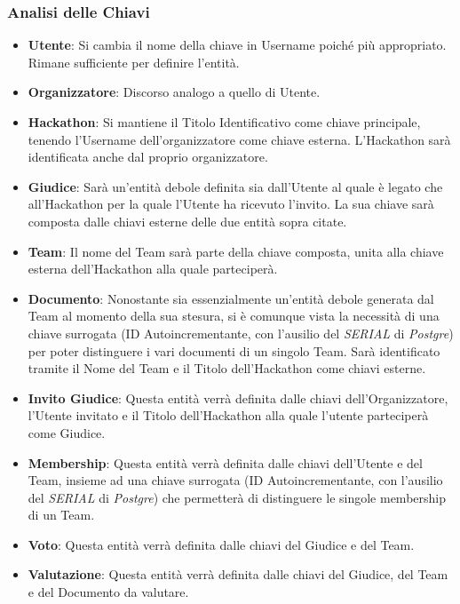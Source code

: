 \documentclass[a4paper, 10pt]{article}
\begin{document}
	\subsubsection{Analisi delle Chiavi}
	\begin{itemize}
		\item \textbf{Utente}: Si cambia il nome della chiave in Username poiché più appropriato. Rimane sufficiente per definire l'entità.
		\item \textbf{Organizzatore}: Discorso analogo a quello di Utente.
		\item \textbf{Hackathon}: Si mantiene il Titolo Identificativo come chiave principale, tenendo l'Username dell'organizzatore come chiave esterna. L'Hackathon sarà identificata anche dal proprio organizzatore.
		\item \textbf{Giudice}: Sarà un'entità debole definita sia dall'Utente al quale è legato che all'Hackathon per la quale l'Utente ha ricevuto l'invito. La sua chiave sarà composta dalle chiavi esterne delle due entità sopra citate.
		\item \textbf{Team}: Il nome del Team sarà parte della chiave composta, unita alla chiave esterna dell'Hackathon alla quale parteciperà.
		\item \textbf{Documento}: Nonostante sia essenzialmente un'entità debole generata dal Team al momento della sua stesura, si è comunque vista la necessità di una chiave surrogata (ID Autoincrementante, con l'ausilio del \textit{SERIAL} di \textit{Postgre}) per poter distinguere i vari documenti di un singolo Team. Sarà identificato tramite il Nome del Team e il Titolo dell'Hackathon come chiavi esterne.
		\item \textbf{Invito Giudice}: Questa entità verrà definita dalle chiavi dell'Organizzatore, l'Utente invitato e il Titolo dell'Hackathon alla quale l'utente parteciperà come Giudice.
		\item \textbf{Membership}: Questa entità verrà definita dalle chiavi dell'Utente e del Team, insieme ad una chiave surrogata (ID Autoincrementante, con l'ausilio del \textit{SERIAL} di \textit{Postgre}) che permetterà di distinguere le singole membership di un Team.
		\item \textbf{Voto}: Questa entità verrà definita dalle chiavi del Giudice e del Team.
		\item \textbf{Valutazione}: Questa entità verrà definita dalle chiavi del Giudice, del Team e del Documento da valutare.
	\end{itemize}
\end{document}
